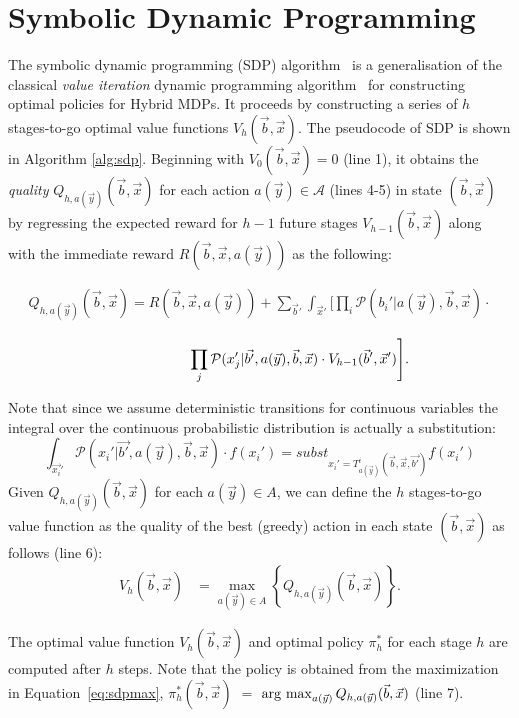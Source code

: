 \documentclass[letterpaper]{article}
\def\argmax{\operatornamewithlimits{arg~max}}
\begin{document}
\section{Symbolic Dynamic Programming}

The symbolic dynamic programming (SDP) algorithm~\cite{sanner11,zamani12} is a generalisation of the classical {\it value iteration} dynamic programming algorithm~\cite{bellman57} for constructing optimal policies for Hybrid MDPs.
It proceeds by constructing a series of $h$ stages-to-go optimal value functions $V_h(\vec{b},\vec{x})$.
The pseudocode of SDP is shown in Algorithm \ref{alg:sdp}.
Beginning with $V_0(\vec{b},\vec{x}) = 0$ (line 1), it obtains the \emph{quality} $Q_{h,a(\vec{y})}(\vec{b},\vec{x})$ for each action $a(\vec{y}) \in \mathcal{A}$ (lines 4-5) in state $(\vec{b},\vec{x})$ by regressing the expected reward for $h-1$ future stages $V_{h-1}(\vec{b},\vec{x})$ along with the immediate reward $R(\vec{b},\vec{x},a(\vec{y}))$ as the following:
{\small
\begin{align}
Q_{h,a(\vec{y})}(\vec{b},\vec{x}) =  R(\vec{b},\vec{x},a(\vec{y})) + \sum_{\vec{b}'} \int_{\vec{x}'} \Bigg[ 
\prod_i \mathcal{P}(b_i' | a(\vec{y}),\vec{b},\vec{x}) \cdot \nonumber 
\end{align}

\begin{align}
\hspace{20mm} \prod_j \mathcal{P}(x_j' | \vec{b'}, a(\vec{y}),\vec{b},\vec{x})\cdot V_{h-1}(\vec{b}',\vec{x}') \Bigg]. \label{eq:sdpregr} 
\end{align}
}
Note that since we assume deterministic transitions for continuous variables the integral over the continuous probabilistic distribution is actually a substitution:
$$
 \int_{\vec{x_i}'} \mathcal{P}(x_i' | \vec{b'}, a(\vec{y}),\vec{b},\vec{x}) \cdot f(x_i') =
subst_{x_i' = T^i_{a(\vec{y})}(\vec{b},\vec{x},\vec{b'})} f(x_i') 
$$
Given $Q_{h,a(\vec{y})}(\vec{b},\vec{x})$ for each $a(\vec{y}) \in A$, we can define the $h$ stages-to-go value function as the quality of the best (greedy) action in each state $(\vec{b},\vec{x})$ as follows (line 6):
\begin{align}
V_{h}(\vec{b},\vec{x}) & = \max_{a(\vec{y}) \in A} \left\{ Q_{h,a(\vec{y})}(\vec{b},\vec{x}) \right\}. \label{eq:sdpmax}
\end{align}

The optimal value function $V_h(\vec{b},\vec{x})$ and optimal policy $\pi^*_h$ for each stage $h$ are computed after $h$ steps. Note that the policy is obtained from the maximization in Equation~\ref{eq:sdpmax}, $\pi^*_h(\vec{b},\vec{x})$ $=$ $\argmax_{a(\vec{y})} Q_{h,a(\vec{y})}(\vec{b},\vec{x})$ (line 7). 
\end{document}
